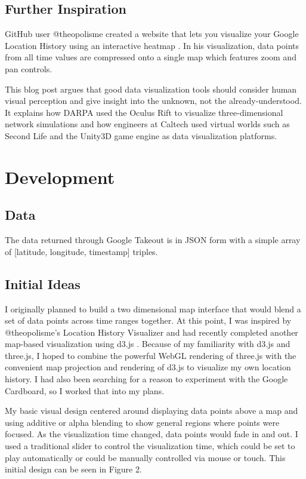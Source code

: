 \documentclass[conference]{acmsiggraph}
\begin{document}
\subsection{Further Inspiration}

GitHub user @theopolisme created a website that lets you visualize your Google
Location History using an interactive heatmap
\cite{location-history-visualizer}. In his visualization, data points from all
time values are compressed onto a single map which features zoom and pan
controls.

This blog post \cite{VR:BigData} argues that good data visualization tools
should consider human visual perception and give insight into the unknown, not
the already-understood. It explains how DARPA used the Oculus Rift to visualize
three-dimensional network simulations and how engineers at Caltech used virtual
worlds such as Second Life and the Unity3D game engine as data visualization
platforms.


\section{Development}

\subsection{Data}

The data returned through Google Takeout is in JSON form with a simple array
of [latitude, longitude, timestamp] triples.

\subsection{Initial Ideas}

I originally planned to build a two dimensional map interface that would blend
a set of data points across time ranges together. At this point, I was inspired
by @theopolisme's Location History Visualizer and had recently completed another
map-based visualization using d3.js \cite{D3.js}. Because of my familiarity with
d3.js and three.js, I hoped to combine the powerful WebGL rendering of three.js
with the convenient map projection and rendering of d3.js to visualize my own
location history. I had also been searching for a reason to experiment with the
Google Cardboard, so I worked that into my plans.

My basic visual design centered around displaying data points above a map and
using additive or alpha blending to show general regions where points were
focused. As the visualization time changed, data points would fade in and out.
I used a traditional slider to control the visualization time, which could be
set to play automatically or could be manually controlled via mouse or touch.
This initial design can be seen in Figure 2.
\end{document}
